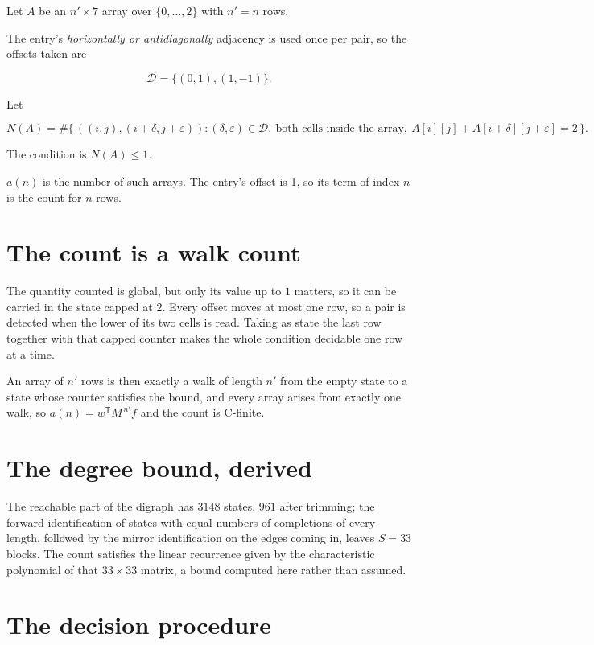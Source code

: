 \documentclass[11pt]{article}
\theoremstyle{definition}
\begin{document}
Let $A$ be an $n' \times 7$ array over $\{0,\dots,2\}$ with $n' = n$ rows.

The entry's {\itshape horizontally or antidiagonally} adjacency is used once per pair, so the offsets taken are

\[\mathcal{D} = \{(0,1), (1,-1)\}.\]

Let

\[N(A) = \#\bigl\{\,((i,j),(i{+}\delta,j{+}\varepsilon)) : (\delta,\varepsilon) \in \mathcal{D},\ \text{both cells inside the array},\ A[i][j] + A[i{+}\delta][j{+}\varepsilon] = 2\,\bigr\}.\]

The condition is $N(A) \le 1$.

$a(n)$ is the number of such arrays. The entry's offset is 1, so its term of index $n$ is the count for $n$ rows.

\section{The count is a walk count}

The quantity counted is global, but only its value up to $1$ matters, so it can be carried in the state capped at $2$. Every offset moves at most one row, so a pair is detected when the lower of its two cells is read. Taking as state the last row together with that capped counter makes the whole condition decidable one row at a time.

An array of $n'$ rows is then exactly a walk of length $n'$ from the empty state to a state whose counter satisfies the bound, and every array arises from exactly one walk, so $a(n) = w^{\mathsf T}M^{\,n'}f$ and the count is C-finite.

\section{The degree bound, derived}

The reachable part of the digraph has $3148$ states, $961$ after trimming; the forward identification of states with equal numbers of completions of every length, followed by the mirror identification on the edges coming in, leaves $S = 33$ blocks. The count satisfies the linear recurrence given by the characteristic polynomial of that $33\times33$ matrix, a bound computed here rather than assumed.

\section{The decision procedure}
\end{document}
